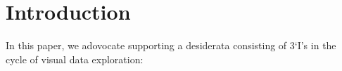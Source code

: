\section{Introduction}
In this paper, we adovocate supporting a desiderata consisting of  3`I's in the cycle of visual data exploration:
